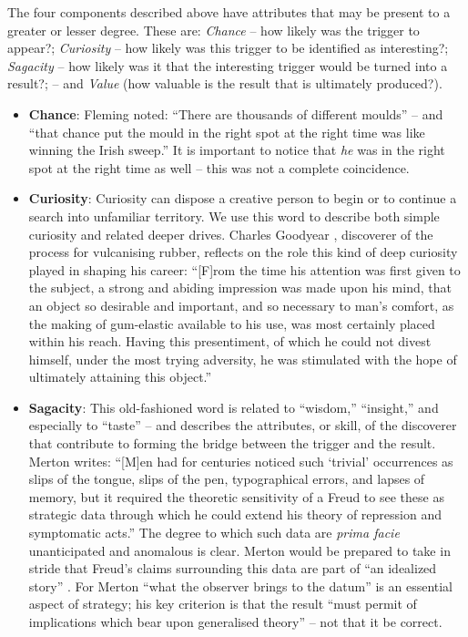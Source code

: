 The four components described above have attributes that may be present to a greater or lesser degree.  These are: \emph{Chance} -- how likely was the trigger to appear?; \emph{Curiosity} -- how likely was this trigger to be identified as interesting?; \emph{Sagacity} -- how likely was it that the interesting trigger would be turned into a result?; -- and \emph{Value} (how valuable is the result that is ultimately produced?).

\begin{itemize}
\item \textbf{Chance}: Fleming \cite{fleming} noted: ``There are
  thousands of different moulds'' -- and ``that chance put the mould
  in the right spot at the right time was like winning the Irish
  sweep.''  It is important to notice that \emph{he} was in the right
  spot at the right time as well -- this was not a complete
  coincidence.
\end{itemize}

\begin{itemize}
\item \textbf{Curiosity}: Curiosity can dispose a creative person to
  begin or to continue a search into unfamiliar territory.  We use
  this word to describe both simple curiosity and related deeper
  drives.  Charles Goodyear \cite{goodyear1855gum}, discoverer of
  the process for vulcanising rubber, reflects on the role this kind
  of deep curiosity played in shaping his career: ``[F]rom the time
  his attention was first given to the subject, a strong and abiding
  impression was made upon his mind, that an object so desirable and
  important, and so necessary to man's comfort, as the making of
  gum-elastic available to his use, was most certainly placed within
  his reach.  Having this presentiment, of which he could not divest
  himself, under the most trying adversity, he was stimulated with the
  hope of ultimately attaining this object.''
\end{itemize}

\begin{itemize}
\item \textbf{Sagacity}: This old-fashioned word is related to
  ``wisdom,'' ``insight,'' and especially to ``taste'' -- and
  describes the attributes, or skill, of the discoverer that
  contribute to forming the bridge between the trigger and the result.
  Merton \cite[p.~507]{merton1948bearing} writes: ``{[}M{]}en
  had for centuries noticed such `trivial' occurrences as slips of the
  tongue, slips of the pen, typographical errors, and lapses of
  memory, but it required the theoretic sensitivity of a Freud to see
  these as strategic data through which he could extend his theory of
  repression and symptomatic acts.''  The degree to which such data
  are \emph{prima facie} unanticipated and anomalous is clear.  Merton
  would be prepared to take in stride that Freud's claims
  surrounding this data are part of ``an idealized story''
  \cite{freudtheory}.  For Merton ``what the observer brings to the
  datum'' is an essential aspect of strategy; his key criterion is
  that the result ``must permit of implications which bear upon
  generalised theory'' -- not that it be correct.
\end{itemize}

